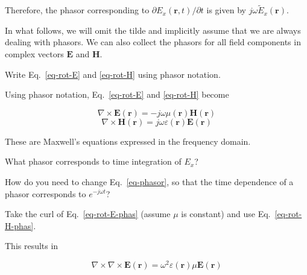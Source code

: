 Therefore, the phasor corresponding to $\partial E_x({\mathbf r},t) / \partial t$ is given by $j \omega \tilde{E}_x({\mathbf r})$.

In what follows, we will omit the tilde and implicitly assume that we are always dealing with phasors. We can also collect the phasors for all field components in complex vectors ${\mathbf E}$ and ${\mathbf H}$. 

\begin{cue}
Write Eq.~\ref{eq-rot-E} and \ref{eq-rot-H} using phasor notation.
\end{cue}

Using phasor notation, Eq.~\ref{eq-rot-E} and \ref{eq-rot-H} become

\begin{equation}
\nabla \times {\mathbf E}({\mathbf r}) = - j \omega \mu({\mathbf r}) {\mathbf H}({\mathbf r})
\label{eq-rot-E-phas}
\end{equation}
\begin{equation}   
\nabla \times {\mathbf H}({\mathbf r}) = j \omega \varepsilon({\mathbf r}) {\mathbf E}({\mathbf r}) \label{eq-rot-H-phas}
\end{equation}

These are Maxwell's equations expressed in the frequency domain.


\begin{exer}
  What phasor corresponds to time integration of $E_x$?
\end{exer}

\begin{exer}
How do you need to change Eq.~\ref{eq-phasor}, so that the time dependence of a phasor corresponds to $e^{-j \omega t}$? 
\end{exer}

\pagebreak


\begin{cue}
Take the curl of Eq.~\ref{eq-rot-E-phas} (assume $\mu$ is constant) and use Eq.~\ref{eq-rot-H-phas}.
\end{cue}

This results in

\begin{equation}
  \nabla \times \nabla \times {\mathbf E}({\mathbf r}) = \omega^2 \varepsilon({\mathbf r}) \mu {\mathbf E}({\mathbf r})
  \label{eq-helm-1}
\end{equation}

